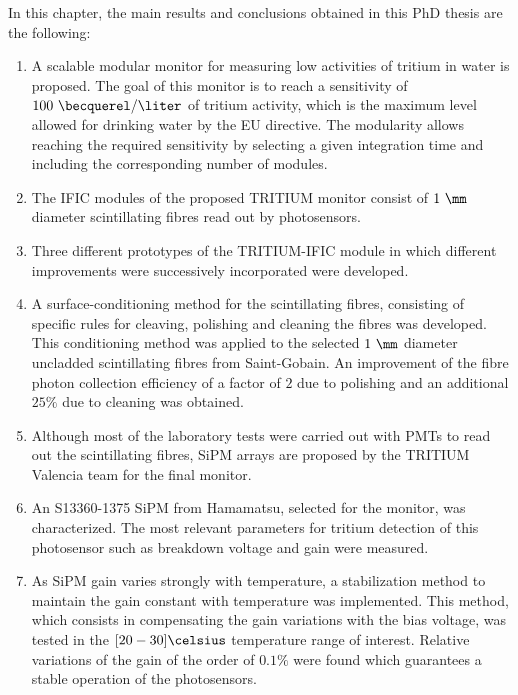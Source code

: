 In this chapter, the main results and conclusions obtained in this PhD thesis are the following:

\begin{enumerate}
\item{} A scalable modular monitor for measuring low activities of tritium in water is proposed. The goal of this monitor is to reach a sensitivity of $100~\becquerel/\liter$ of tritium activity, which is the maximum level allowed for drinking water by the EU directive. The modularity allows reaching the required sensitivity by selecting a given integration time and including the corresponding number of modules.

\item{} The IFIC modules of the proposed TRITIUM monitor consist of $1~\mm$ diameter scintillating fibres read out by photosensors.

\item{} Three different prototypes of the TRITIUM-IFIC module in which different improvements were successively incorporated were developed.

\item{} A surface-conditioning method for the scintillating fibres, consisting of specific rules for cleaving, polishing and cleaning the fibres was developed. This conditioning method was applied to the selected $1~\mm$ diameter uncladded scintillating fibres from Saint-Gobain. An improvement of the fibre photon collection efficiency of a factor of $2$ due to polishing and an additional $25\%$ due to cleaning was obtained.

\item{} Although most of the laboratory tests were carried out with PMTs to read out the scintillating fibres, SiPM arrays are proposed by the TRITIUM Valencia team for the final monitor.

\item{} An S13360-1375 SiPM from Hamamatsu, selected for the monitor, was characterized. The most relevant parameters for tritium detection of this photosensor such as breakdown voltage and gain were measured.

\item{} As SiPM gain varies strongly with temperature, a stabilization method to maintain the gain constant with temperature was implemented. This method, which consists in compensating the gain variations with the bias voltage, was tested in the $[20-30]\celsius$ temperature range of interest. Relative variations of the gain of the order of $0.1\%$ were found which guarantees a stable operation of the photosensors.


\end{enumerate}
